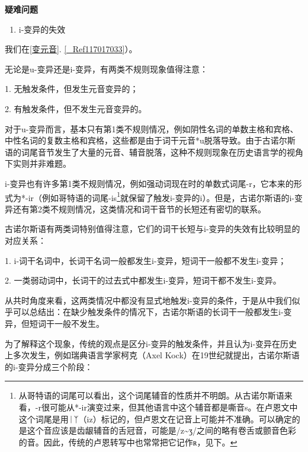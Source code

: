 {{\textbf{疑难问题}

\begin{enumerate}
  \def\labelenumi{\arabic{enumi})}
  \item
        i-变异的失效
\end{enumerate}

我们在\ref{变元音}.
\ref{_Ref117017033}）。

无论是u-变异还是i-变异，有两类不规则现象值得注意：

1. 无触发条件，但发生元音变异的；

2. 有触发条件，但不发生元音变异的。

对于u-变异而言，基本只有第1类不规则情况，例如阴性名词的单数主格和宾格、中性名词的复数主格和宾格，这些都是由于词干元音*u脱落导致。由于古诺尔斯语的词尾音节发生了大量的元音、辅音脱落，这种不规则现象在历史语言学的视角下实则并非难题。

i-变异也有许多第1类不规则情况，例如强动词现在时的单数式词尾-r，它本来的形式为*-ir（例如哥特语的词尾-is\footnote{从哥特语的词尾可以看出，这个词尾辅音的性质并不明朗。从古诺尔斯语来看，-r很可能从*-ir演变过来，但其他语言中这个辅音都是嘶音s。在卢恩文中这个词尾是用ᛁᛉ（iz）标记的，但卢恩文在记音上可能并不准确。可以确定的是这个音应该是齿龈辅音的舌冠音，可能是/z\textasciitilde ʒ/之间的略有卷舌或颤音色彩的音。因此，传统的卢恩转写中也常常把它记作ʀ，见下。}就保留了触发i-变异的i）。但是，古诺尔斯语的i-变异还有第2类不规则情况，这类情况和词干音节的长短还有密切的联系。

古诺尔斯语有两类词特别值得注意，它们的词干长短与i-变异的失效有比较明显的对应关系：

1. i-词干名词中，长词干名词一般都发生i-变异，短词干一般都不发生i-变异；

2. 一类弱动词中，长词干的过去式中都发生i-变异，短词干都不发生i-变异。

从共时角度来看，这两类情况中都没有显式地触发i-变异的条件，于是从中我们似乎可以总结出：在缺少触发条件的情况下，古诺尔斯语的长词干一般都发生i-变异，但短词干一般不发生。

为了解释这个现象，传统的观点是区分i-变异的触发条件，并且认为i-变异在历史上多次发生，例如瑞典语言学家柯克（Axel
Kock）在19世纪就提出，古诺尔斯语的i-变异分成三个阶段：

}}
